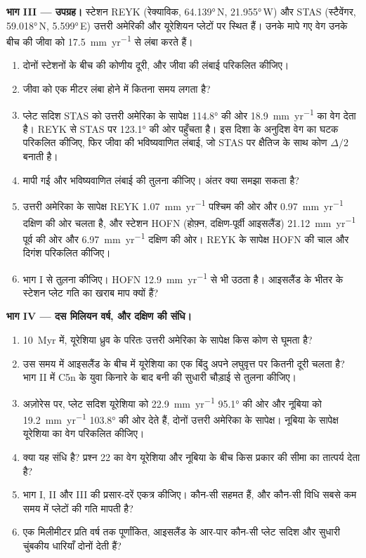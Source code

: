 \begin{problem}
\noindent\textbf{भाग III --- उपग्रह।}
 स्टेशन REYK (रेक्याविक, \ang{64.139}\,N, \ang{21.955}\,W) और STAS (स्टैवेंगर, \ang{59.018}\,N, \ang{5.599}\,E) उत्तरी अमेरिकी और यूरेशियन प्लेटों पर स्थित हैं। उनके मापे गए वेग उनके बीच की जीवा को \qty{17.5}{mm.yr^{-1}} से लंबा करते हैं।
\begin{enumerate}[resume]
  \item दोनों स्टेशनों के बीच की कोणीय दूरी, और जीवा की लंबाई परिकलित कीजिए।
  \item जीवा को एक मीटर लंबा होने में कितना समय लगता है?
  \item प्लेट सदिश STAS को उत्तरी अमेरिका के सापेक्ष \ang{114.8} की ओर \qty{18.9}{mm.yr^{-1}} का वेग देता है। REYK से  STAS पर \ang{123.1} की ओर पहुँचता है। इस दिशा के अनुदिश वेग का घटक परिकलित कीजिए, फिर जीवा की भविष्यवाणित लंबाई, जो STAS पर क्षैतिज के साथ कोण $\Delta/2$ बनाती है।
  \item मापी गई और भविष्यवाणित लंबाई की तुलना कीजिए। अंतर क्या समझा सकता है?
  \item उत्तरी अमेरिका के सापेक्ष REYK \qty{1.07}{mm.yr^{-1}} पश्चिम की ओर और \qty{0.97}{mm.yr^{-1}} दक्षिण की ओर चलता है, और स्टेशन HOFN (होफ़्न, दक्षिण-पूर्वी आइसलैंड) \qty{21.12}{mm.yr^{-1}} पूर्व की ओर और \qty{6.97}{mm.yr^{-1}} दक्षिण की ओर। REYK के सापेक्ष HOFN की चाल और दिगंश परिकलित कीजिए।
  \item भाग I से तुलना कीजिए। HOFN \qty{12.9}{mm.yr^{-1}} से भी उठता है। आइसलैंड के भीतर के स्टेशन प्लेट गति का खराब माप क्यों हैं?
\end{enumerate}

\noindent\textbf{भाग IV --- दस मिलियन वर्ष, और दक्षिण की संधि।}
\begin{enumerate}[resume]
  \item \qty{10}{Myr} में, यूरेशिया ध्रुव के परितः उत्तरी अमेरिका के सापेक्ष किस कोण से घूमता है?
  \item उस समय में आइसलैंड के बीच में यूरेशिया का एक बिंदु अपने लघुवृत्त पर कितनी दूरी चलता है? भाग II में C5n के युवा किनारे के बाद बनी  की सुधारी चौड़ाई से तुलना कीजिए।
  \item अज़ोरेस  पर, प्लेट सदिश यूरेशिया को \qty{22.9}{mm.yr^{-1}} \ang{95.1} की ओर और नूबिया को \qty{19.2}{mm.yr^{-1}} \ang{103.8} की ओर देते हैं, दोनों उत्तरी अमेरिका के सापेक्ष। नूबिया के सापेक्ष यूरेशिया का वेग परिकलित कीजिए।
  \item क्या यह संधि  है? प्रश्न 22 का वेग यूरेशिया और नूबिया के बीच किस प्रकार की सीमा का तात्पर्य देता है?
  \item भाग I, II और III की प्रसार-दरें एकत्र कीजिए। कौन-सी सहमत हैं, और कौन-सी विधि सबसे कम समय में प्लेटों की गति मापती है?
  \item एक मिलीमीटर प्रति वर्ष तक पूर्णांकित, आइसलैंड के आर-पार कौन-सी  प्लेट सदिश और सुधारी चुंबकीय धारियाँ दोनों देती हैं?
\end{enumerate}
\end{problem}
